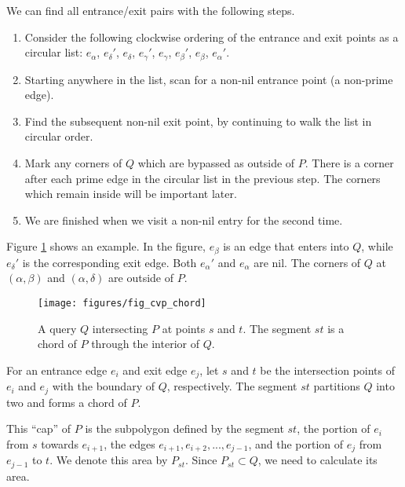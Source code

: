 We can find all entrance/exit pairs with the following steps.
\begin{enumerate}
 \item Consider the following clockwise ordering of the entrance and exit points as a circular list: $e_\alpha$, $e_\delta'$, $e_\delta$, $e_\gamma'$, $e_\gamma$, $e_\beta'$, $e_\beta$, $e_\alpha'$.
 
 \item Starting anywhere in the list, scan for a non-nil entrance point (a non-prime edge).
 
 \item Find the subsequent non-nil exit point, by continuing to walk the list in circular order.
 
 \item Mark any corners of $Q$ which are bypassed as outside of $P$. There is a corner after each prime edge in the circular list in the previous step. The corners which remain inside will be important later.
 
 \item We are finished when we visit a non-nil entry for the second time.
\end{enumerate}

Figure \ref{fig:convexp:chord} shows an example. In the figure, $e_\beta$ is an edge that enters into $Q$, while $e_\delta'$ is the corresponding exit edge. Both $e_\alpha'$ and $e_\alpha$ are nil. The corners of $Q$ at $(\alpha, \beta)$ and $(\alpha, \delta)$ are outside of $P$.

\begin{figure}[t]
\begin{center}
  \texttt{[image: figures/fig\_cvp\_chord]}
  \caption[A query $Q$ intersecting $P$ at points $s$ and $t$.]{A query $Q$ intersecting $P$ at points $s$ and $t$. The segment $st$ is a chord of $P$ through the interior of $Q$.}
  \label{fig:convexp:chord}
\end{center}
\end{figure}

For an entrance edge $e_i$ and exit edge $e_j$, let $s$ and $t$ be the intersection points of $e_i$ and $e_j$ with the boundary of $Q$, respectively. The segment $st$ partitions $Q$ into two and forms a chord of $P$.

This ``cap'' of $P$ is the subpolygon defined by the segment $st$, the portion of $e_i$ from $s$ towards $e_{i+1}$, the edges $e_{i+1}, e_{i+2}, ..., e_{j-1}$, and the portion of $e_j$ from $e_{j-1}$ to $t$. We denote this area by $P_{st}$. Since $P_{st} \subset Q$, we need to calculate its area.

